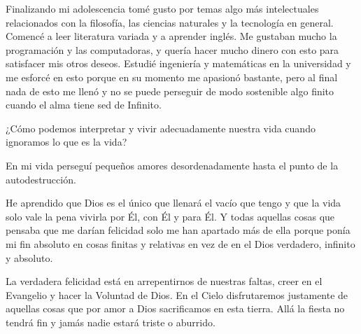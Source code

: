 \documentclass[12pt]{article}
\begin{document}
Finalizando mi adolescencia tomé gusto por temas algo más intelectuales
relacionados con la filosofía, las ciencias naturales y la tecnología en
general. Comencé a leer literatura variada y a aprender inglés. Me gustaban
mucho la programación y las computadoras, y quería hacer mucho dinero con esto
para satisfacer mis otros deseos. Estudié ingeniería y matemáticas en la
universidad y me esforcé en esto porque en su momento me apasionó bastante, pero
al final nada de esto me llenó y no se puede perseguir de modo sostenible algo
finito cuando el alma tiene sed de Infinito.

¿Cómo podemos interpretar y vivir adecuadamente nuestra vida cuando ignoramos lo
que es la vida?

En mi vida perseguí pequeños amores desordenadamente hasta el punto de la
autodestrucción. 

He aprendido que Dios es el único que llenará el vacío que tengo y que la vida
solo vale la pena vivirla por Él, con Él y para Él. Y todas aquellas cosas que
pensaba que me darían felicidad solo me han apartado más de ella porque ponía mi
fin absoluto en cosas finitas y relativas en vez de en el Dios verdadero,
infinito y absoluto.

La verdadera felicidad está en arrepentirnos de nuestras faltas, creer en el
Evangelio y hacer la Voluntad de Dios. En el Cielo disfrutaremos justamente de
aquellas cosas que por amor a Dios sacrificamos en esta tierra. Allá la fiesta
no tendrá fin y jamás nadie estará triste o aburrido.
\end{document}
